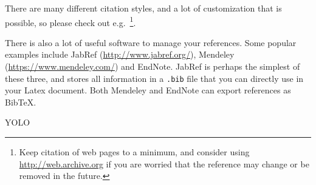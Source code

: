There are many different citation styles, and a lot of customization that is possible, so please check out e.g.~\cite{BiberBibtexEtc,WikibookLatex}\footnote{Keep citation of web pages to a minimum, and consider using \url{http://web.archive.org} if you are worried that the reference may change or be removed in the future.}.

There is also a lot of useful software to manage your references. Some popular examples include JabRef (\url{http://www.jabref.org/}), Mendeley (\url{https://www.mendeley.com/}) and EndNote. JabRef is perhaps the simplest of these three, and stores all information in a \texttt{.bib} file that you can directly use in your Latex document. Both Mendeley and EndNote can export references as BibTeX.


YOLO